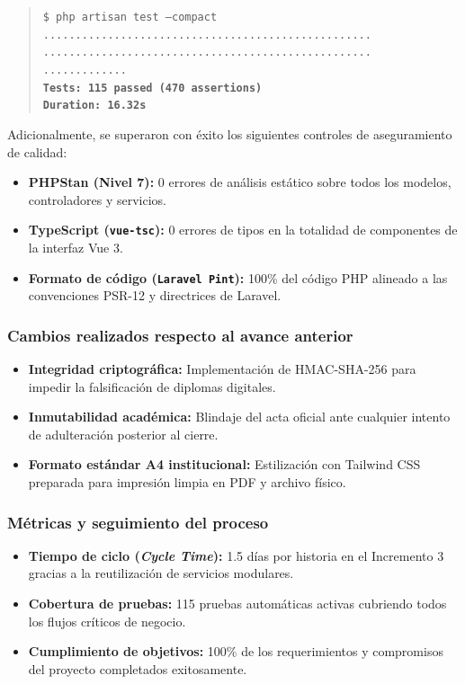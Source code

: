 \begin{quote}
    \texttt{\$ php artisan test --compact} \\
    \texttt{...................................................} \\
    \texttt{...................................................} \\
    \texttt{.............} \\
    \texttt{\textbf{Tests: 115 passed (470 assertions)}} \\
    \texttt{\textbf{Duration: 16.32s}}
\end{quote}

Adicionalmente, se superaron con éxito los siguientes controles de aseguramiento de calidad:
\begin{itemize}[nosep]
    \item \textbf{PHPStan (Nivel 7):} 0 errores de análisis estático sobre todos los modelos, controladores y servicios.
    \item \textbf{TypeScript (\texttt{vue-tsc}):} 0 errores de tipos en la totalidad de componentes de la interfaz Vue 3.
    \item \textbf{Formato de código (\texttt{Laravel Pint}):} 100\% del código PHP alineado a las convenciones PSR-12 y directrices de Laravel.
\end{itemize}

\subsubsection{Cambios realizados respecto al avance anterior}
\begin{itemize}[nosep]
    \item \textbf{Integridad criptográfica:} Implementación de HMAC-SHA-256 para impedir la falsificación de diplomas digitales.
    \item \textbf{Inmutabilidad académica:} Blindaje del acta oficial ante cualquier intento de adulteración posterior al cierre.
    \item \textbf{Formato estándar A4 institucional:} Estilización con Tailwind CSS preparada para impresión limpia en PDF y archivo físico.
\end{itemize}

\subsubsection{Métricas y seguimiento del proceso}
\begin{itemize}[nosep]
    \item \textbf{Tiempo de ciclo (\textit{Cycle Time}):} 1.5 días por historia en el Incremento 3 gracias a la reutilización de servicios modulares.
    \item \textbf{Cobertura de pruebas:} 115 pruebas automáticas activas cubriendo todos los flujos críticos de negocio.
    \item \textbf{Cumplimiento de objetivos:} 100\% de los requerimientos y compromisos del proyecto completados exitosamente.
\end{itemize}


